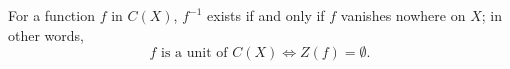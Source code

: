For a function $f$ in $C(X)$, $f^{-1}$ exists if and only if $f$ vanishes nowhere on $X$; in other words,
$$f \text{ is a unit of } C(X) \iff Z(f) = \emptyset.$$
